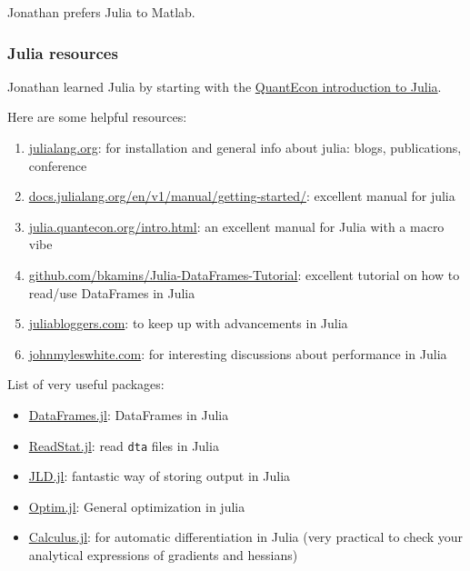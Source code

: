 Jonathan prefers Julia to Matlab.

\subsubsection{Julia resources}
Jonathan learned Julia by starting with the \href{https://julia.quantecon.org/intro.html}{QuantEcon introduction to Julia}.

Here are some helpful resources:
\begin{enumerate}
\item \href{https://julialang.org}{julialang.org}: for installation and general info about julia: blogs, publications, conference
\item \href{https://docs.julialang.org/en/v1/manual/getting-started/}{docs.julialang.org/en/v1/manual/getting-started/}: excellent manual for julia
\item \href{https://julia.quantecon.org/intro.html}{julia.quantecon.org/intro.html}: an excellent manual for Julia with a macro vibe
\item \href{https://github.com/bkamins/Julia-DataFrames-Tutorial}{github.com/bkamins/Julia-DataFrames-Tutorial}: excellent tutorial on how to read/use DataFrames in Julia
\item \href{https://www.juliabloggers.com/}{juliabloggers.com}: to keep up with advancements in Julia
\item \href{http://www.johnmyleswhite.com/}{johnmyleswhite.com}: for interesting discussions about performance in Julia 
\end{enumerate}

List of very useful packages:
\begin{itemize}
\item \href{https://github.com/JuliaData/DataFrames.jl}{DataFrames.jl}: DataFrames in Julia
\item \href{https://github.com/davidanthoff/ReadStat.jl}{ReadStat.jl}: read \texttt{dta} files in Julia
\item \href{https://github.com/JuliaIO/JLD.jl}{JLD.jl}: fantastic way of storing output in Julia
\item \href{https://github.com/JuliaNLSolvers/Optim.jl}{Optim.jl}: General optimization in julia
\item \href{https://github.com/johnmyleswhite/Calculus.jl}{Calculus.jl}: for automatic differentiation in Julia (very practical to check your analytical expressions of gradients and hessians)
\end{itemize}


